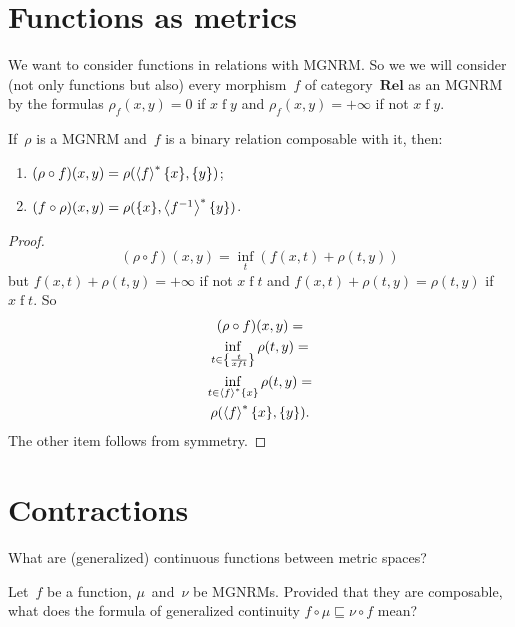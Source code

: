 
\section{Functions as metrics}

We want to consider functions in relations with MGNRM. So we we will consider (not only functions but also) every morphism~$f$ of category~$\mathbf{Rel}$ as an MGNRM by the formulas $\rho_{f}(x,y) = 0$ if $x\mathrel{f}y$ and $\rho_{f}(x,y) = +\infty$ if not $x\mathrel{f}y$.


\begin{thm}
If~$\rho$ is a MGNRM and~$f$ is a binary relation composable with it, then:
\begin{enumerate}
\item $(\rho\circ f)(x,y) = \rho(\left\langle f\right\rangle ^{\ast}\{x\},\{y\})$;
\item $(f\circ\rho)(x,y) = \rho(\{x\},\left\langle f^{-1}\right\rangle ^{\ast}\{y\})$.
\end{enumerate}
\end{thm}

\begin{proof}
~
\[
(\rho\circ f)(x,y) = \inf_{t}(f(x,t) + \rho(t,y))
\]
but $f(x,t) + \rho(t,y) = +\infty$ if not $x\mathrel{f}t$ and $f(x,t) + \rho(t,y) = \rho(t,y)$ if $x\mathrel{f}t$. So
\begin{multline*}
(\rho\circ f)(x,y) = \\
\inf_{t\in\left\{ \frac{t}{x\mathrel{f}t}\right\}}\rho(t,y) = \\
\inf_{t\in\left\langle f\right\rangle ^{\ast}\{x\}}\rho(t,y) = \\
\rho(\left\langle f\right\rangle ^{\ast}\{x\},\{y\}).
\end{multline*}
The other item follows from symmetry.
\end{proof}


\section{Contractions}

What are (generalized) continuous functions between metric spaces?

Let~$f$ be a function, $\mu$~and~$\nu$ be MGNRMs. Provided that they are composable, what does the formula of generalized continuity $f\circ\mu\sqsubseteq\nu\circ f$ mean?


